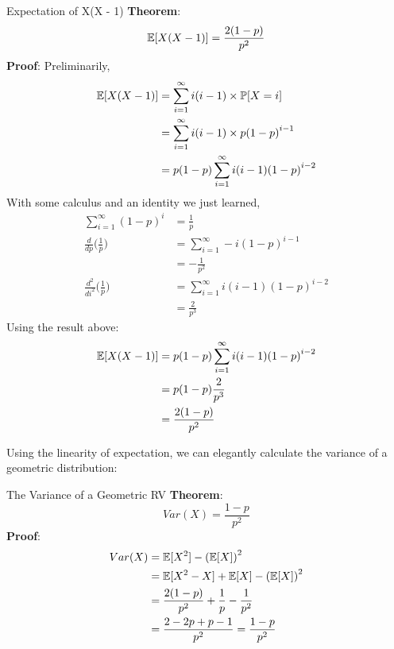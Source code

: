\begin{ln-theorem}{Expectation of X(X - 1)}{}
    \textbf{Theorem}:
    \[\mathbb{E}[X(X - 1)] = \frac{2(1 - p)}{p^2}\]
    \tcblower
    \textbf{Proof}:
    Preliminarily,
    \begin{align*}
        \mathbb{E}[X(X - 1)]
        &= \sum_{i = 1}^\infty i(i - 1) \times \mathbb{P}[X = i] \\
        &= \sum_{i = 1}^\infty i(i - 1) \times p{(1 - p)}^{i - 1} \\
        &= p(1 - p) \sum_{i = 1}^\infty i(i - 1) {(1 - p)}^{i - 2}
    \end{align*}
    With some calculus and an identity we just learned,
    \begin{align*}
        \sum_{i = 1}^\infty {(1 - p)}^i &= \frac{1}{p} \\
        \frac{d}{dp} \bigg( \frac{1}{p} \bigg) &= \sum_{i = 1}^\infty -i{(1 - p)}^{i - 1} \\
        &= -\frac{1}{p^2} \\
        \frac{d^2}{di^2} \bigg( \frac{1}{p} \bigg) &= \sum_{i = 1}^\infty i(i - 1) {(1 - p)}^{i - 2} \\
        &= \frac{2}{p^3}
    \end{align*}
    Using the result above:
    \begin{align*}
        \mathbb{E}[X(X - 1)]
        &= p(1 - p) \sum_{i = 1}^\infty i(i - 1) {(1 - p)}^{i - 2} \\
        &= p(1 - p) \frac{2}{p^3} \\
        &= \frac{2(1 - p)}{p^2}
    \end{align*}
\end{ln-theorem}

Using the linearity of expectation, we can elegantly calculate the variance of a geometric distribution:
\begin{ln-theorem}{The Variance of a Geometric RV}{}
    \textbf{Theorem}:
    \[Var(X) = \frac{1 - p}{p^2}\]
    \tcblower
    \textbf{Proof}:
    \begin{align*}
        Var(X) &= \mathbb{E}[X^2] - {(\mathbb{E}[X])}^2 \\
        &= \mathbb{E}[X^2 - X] + \mathbb{E}[X] - {(\mathbb{E}[X])}^2 \\
        &= \frac{2(1 - p)}{p^2} + \frac{1}{p} - \frac{1}{p^2} \\
        &= \frac{2 - 2p + p - 1}{p^2} = \frac{1 - p}{p^2}
    \end{align*}
\end{ln-theorem}

